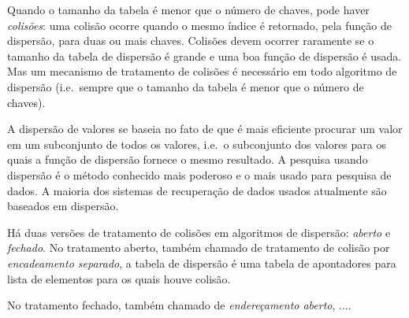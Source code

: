   Quando o tamanho da tabela é menor que o número
de chaves, pode haver {\em colisões\/}: uma colisão ocorre quando o
mesmo índice é retornado, pela função de dispersão, para duas ou mais
chaves. Colisões devem ocorrer raramente se o tamanho da tabela de
dispersão é grande e uma boa função de dispersão é usada.  Mas um
mecanismo de tratamento de colisões é necessário em todo algoritmo de
dispersão (i.e.~sempre que o tamanho da tabela é menor que o número de
chaves).

A dispersão de valores se baseia no fato de que é mais eficiente
procurar um valor em um subconjunto de todos os valores, i.e.~o
subconjunto dos valores para os quais a função de dispersão fornece o
mesmo resultado. A pesquisa usando dispersão é o método conhecido mais
poderoso e o mais usado para pesquisa de dados. A maioria dos sistemas
de recuperação de dados usados atualmente são baseados em dispersão.

Há duas versões de tratamento de colisões em algoritmos de dispersão:
{\em aberto\/} e {\em fechado}. No tratamento aberto, também chamado
de tratamento de colisão por {\em encadeamento separado}, a tabela de
dispersão é uma tabela de apontadores para lista de elementos para os
quais houve colisão.

No tratamento fechado, também chamado de {\em endereçamento aberto\/},
....




